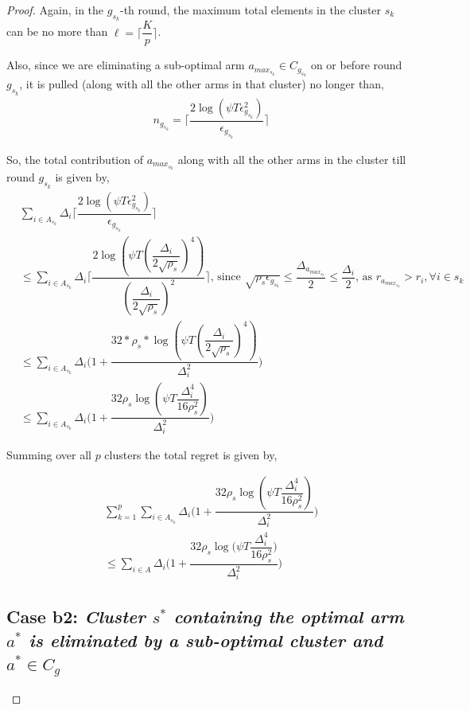\begin{proof}
	Again, in the $g_{s_{k}}$-th round, the maximum total elements in the cluster $s_{k}$ can be no more than $\ell=\bigg\lceil \dfrac{K}{p}\bigg\rceil$.
 
Also, since we are eliminating a sub-optimal arm $a_{max_{s_{k}}}\in C_{g_{s_{k}}}$ on or before round $g_{s_{k}}$, it is pulled (along with all the other arms in that cluster) no longer than,
 \begin{align*}
 &n_{g_{s_{k}}}=\bigg\lceil\dfrac{2\log{(\psi T\epsilon_{g_{s_{k}}}^{2})}}{\epsilon_{g_{s_{k}}}}\bigg\rceil
 \end{align*}

So, the total contribution of $a_{max_{s_{k}}}$  along with all the other arms in the cluster till round $g_{s_{k}}$ is given by,
 \begin{align*}
 &\sum_{i\in A_{s_{k}}}\Delta_{i}\bigg\lceil\dfrac{2\log{(\psi T\epsilon_{g_{s_{k}}}^{2})}}{\epsilon_{g_{s_{k}}}}\bigg\rceil\\
 &\leq\sum_{i\in A_{s_{k}}}\Delta_{i}\bigg\lceil\dfrac{2\log{(\psi T(\dfrac{\Delta_{i}}{2\sqrt{\rho_{s}}})^{4})}}{(\dfrac{\Delta_{i}}{2\sqrt{\rho_{s}}})^{2}}\bigg\rceil \text{, since }\sqrt{\rho_{s}\epsilon_{g_{s_{k}}}}\leq\dfrac{\Delta_{a_{max_{s_{k}}}}}{2}\leq  \dfrac{\Delta_{i}}{2} \text{, as } {r}_{a_{max_{s_{k}}}}>{r}_{i},\forall i\in s_{k}\\
 &\leq\sum_{i\in A_{s_{k}}}\Delta_{i}\bigg(1+\dfrac{32*\rho_{s}*\log{(\psi T(\dfrac{\Delta_{i}}{2\sqrt{\rho_{s}}})^{4})}}{\Delta_{i}^{2}}\bigg)\\
 &\leq\sum_{i\in A_{s_{k}}}\Delta_{i}\bigg(1+\dfrac{32\rho_{s}\log{(\psi T\dfrac{\Delta_{i}^{4}}{16\rho_{s}^{2}})}}{\Delta_{i}^{2}}\bigg)
 \end{align*}

 
Summing over all $p$ clusters the total regret is given by,
 
\begin{align*}
&\sum_{k=1}^{p}\sum_{i\in A_{s_{k}}}\Delta_{i}\bigg(1+\dfrac{32\rho_{s}\log{(\psi  T\dfrac{\Delta_{i}^{4}}{16\rho_{s}^{2}})}}{\Delta_{i}^{2}}\bigg)\\
&\leq\sum_{i\in A}\Delta_{i}\bigg(1+\dfrac{32\rho_{s}\log{(\psi T\dfrac{\Delta_{i}^{4}}{16\rho_{s}^{2}}})}{\Delta_{i}^{2}}\bigg)
\end{align*}


\subsection*{Case b2: \textit{Cluster $s^{*}$ containing the optimal arm $a^{*}$ is eliminated by a sub-optimal cluster and $a^{*}\in C_{g}$ }} 
	

\end{proof}
